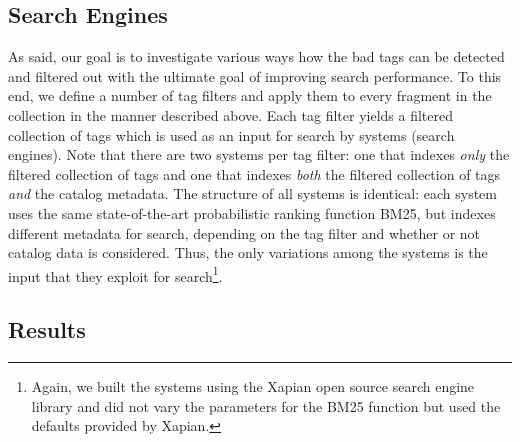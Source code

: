 \subsection{Search Engines}
As said, our goal is to investigate various ways how the bad tags can be detected and filtered out with the ultimate goal of improving search performance. To this end, we define a number of tag filters and apply them to every fragment in the collection in the manner described above. Each tag filter yields a filtered collection of tags which is used as an input for search by systems (search engines). Note that there are two systems per tag filter: one that indexes \textit{only} the filtered collection of tags and one that indexes \textit{both} the filtered collection of tags \textit{and} the catalog metadata. The structure of all systems is identical: each system uses the same state-of-the-art probabilistic ranking function BM25, but indexes different metadata for search, depending on the tag filter and whether or not catalog data is considered. Thus, the only variations among the systems is the input that they exploit for search\footnote{Again, we built the systems using the Xapian open source search engine library and did not vary the parameters for the BM25 function but used the defaults provided by Xapian.}.

\subsection{Results} \label{filter:sec:res}

